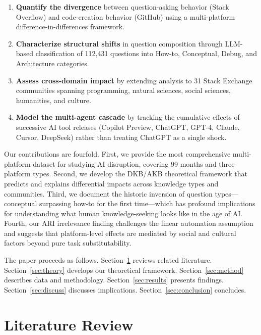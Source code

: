 \documentclass[11pt,a4paper]{article}
\begin{document}
\begin{enumerate}
\item \textbf{Quantify the divergence} between question-asking behavior (Stack Overflow) and code-creation behavior (GitHub) using a multi-platform difference-in-differences framework.

\item \textbf{Characterize structural shifts} in question composition through LLM-based classification of 112,431 questions into How-to, Conceptual, Debug, and Architecture categories.

\item \textbf{Assess cross-domain impact} by extending analysis to 31 Stack Exchange communities spanning programming, natural sciences, social sciences, humanities, and culture.

\item \textbf{Model the multi-agent cascade} by tracking the cumulative effects of successive AI tool releases (Copilot Preview, ChatGPT, GPT-4, Claude, Cursor, DeepSeek) rather than treating ChatGPT as a single shock.
\end{enumerate}

Our contributions are fourfold. First, we provide the most comprehensive multi-platform dataset for studying AI disruption, covering 99 months and three platform types. Second, we develop the DKB/AKB theoretical framework that predicts and explains differential impacts across knowledge types and communities. Third, we document the historic inversion of question types---conceptual surpassing how-to for the first time---which has profound implications for understanding what human knowledge-seeking looks like in the age of AI. Fourth, our ARI irrelevance finding challenges the linear automation assumption and suggests that platform-level effects are mediated by social and cultural factors beyond pure task substitutability.

The paper proceeds as follows. Section~\ref{sec:lit} reviews related literature. Section~\ref{sec:theory} develops our theoretical framework. Section~\ref{sec:method} describes data and methodology. Section~\ref{sec:results} presents findings. Section~\ref{sec:discuss} discusses implications. Section~\ref{sec:conclusion} concludes.

\section{Literature Review}
\label{sec:lit}
\end{document}

